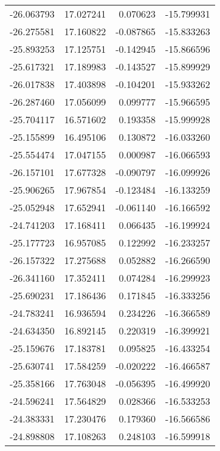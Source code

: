 \begin{tabular}{rrrr}
      -26.063793 &        17.027241 &    0.070623 & -15.799931 \\
      -26.275581 &        17.160822 &   -0.087865 & -15.833263 \\
      -25.893253 &        17.125751 &   -0.142945 & -15.866596 \\
      -25.617321 &        17.189983 &   -0.143527 & -15.899929 \\
      -26.017838 &        17.403898 &   -0.104201 & -15.933262 \\
      -26.287460 &        17.056099 &    0.099777 & -15.966595 \\
      -25.704117 &        16.571602 &    0.193358 & -15.999928 \\
      -25.155899 &        16.495106 &    0.130872 & -16.033260 \\
      -25.554474 &        17.047155 &    0.000987 & -16.066593 \\
      -26.157101 &        17.677328 &   -0.090797 & -16.099926 \\
      -25.906265 &        17.967854 &   -0.123484 & -16.133259 \\
      -25.052948 &        17.652941 &   -0.061140 & -16.166592 \\
      -24.741203 &        17.168411 &    0.066435 & -16.199924 \\
      -25.177723 &        16.957085 &    0.122992 & -16.233257 \\
      -26.157322 &        17.275688 &    0.052882 & -16.266590 \\
      -26.341160 &        17.352411 &    0.074284 & -16.299923 \\
      -25.690231 &        17.186436 &    0.171845 & -16.333256 \\
      -24.783241 &        16.936594 &    0.234226 & -16.366589 \\
      -24.634350 &        16.892145 &    0.220319 & -16.399921 \\
      -25.159676 &        17.183781 &    0.095825 & -16.433254 \\
      -25.630741 &        17.584259 &   -0.020222 & -16.466587 \\
      -25.358166 &        17.763048 &   -0.056395 & -16.499920 \\
      -24.596241 &        17.564829 &    0.028366 & -16.533253 \\
      -24.383331 &        17.230476 &    0.179360 & -16.566586 \\
      -24.898808 &        17.108263 &    0.248103 & -16.599918 \\

\end{tabular}
